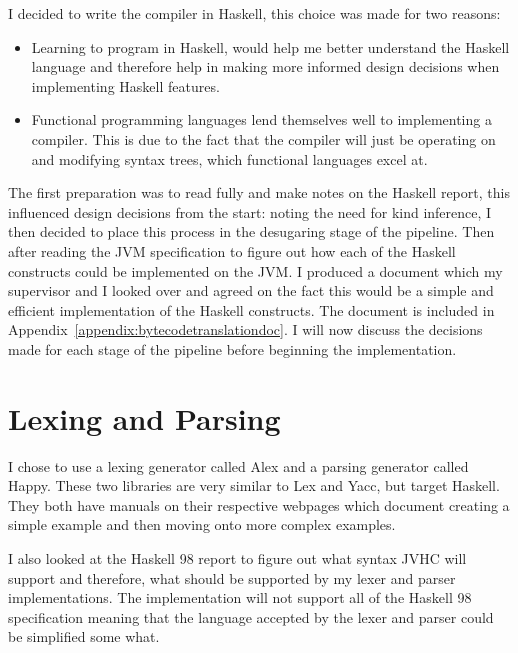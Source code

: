 \documentclass[float=false, crop=false]{standalone}
\begin{document}
I decided to write the compiler in Haskell, this choice was made for two reasons: 
\begin{itemize}
  \item Learning to program in Haskell, would help me better understand the Haskell language
    and therefore help in making more informed design decisions when implementing Haskell features.

  \item Functional programming languages lend themselves well to implementing a compiler. This is due to the fact that the compiler will just be operating
    on and modifying syntax trees, which functional languages excel at.

\end{itemize}

  The first preparation was to read fully and make notes on
  the Haskell report, this influenced design decisions from the start:
  noting the need for kind inference, I then decided to 
  place this process in the desugaring stage of the pipeline. 
  Then after reading the JVM 
  specification\cite{jvm-spec8} to figure out how each of the 
  Haskell constructs could be implemented on the JVM. I produced a
  document which my supervisor and I looked over and agreed
  on the fact this would be a simple and efficient implementation
  of the Haskell constructs. The document is included in 
  Appendix~\ref{appendix:bytecodetranslationdoc}. I will now discuss
  the decisions made for each stage of the pipeline before beginning
  the implementation.


\section{Lexing and Parsing}

I chose to use a lexing generator called Alex\cite{alex-lib} and a parsing generator called 
Happy\cite{happy-lib}.
These two libraries are very similar to Lex\cite{lex-lib} and Yacc\cite{yacc-lib}, but target
Haskell.
They both have manuals on their respective webpages which document creating a simple example and then
moving onto more complex examples.

I also looked at the Haskell 98 report \cite[2.,3.]{haskell98-spec}
to figure out what syntax JVHC will support and therefore, what 
should be supported by my lexer and parser implementations.
The implementation will not support all of the Haskell 98 
specification meaning that the 
language accepted by the lexer and parser could be simplified some what.
\end{document}
